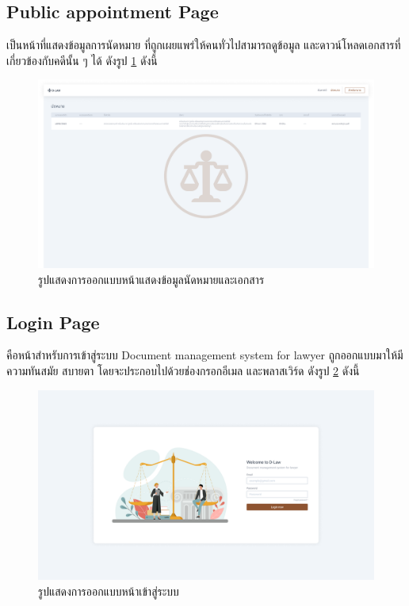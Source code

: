 \documentclass[12pt,oneside,openright,a4paper]{cpe-thai-project}
\begin{document}
\newpage
\subsection{Public appointment Page}
\hspace*{1cm} เป็นหน้าที่แสดงข้อมูลการนัดหมาย ที่ถูกเผยแพร่ให้คนทั่วไปสามารถดูข้อมูล และดาวน์โหลดเอกสารที่เกี่ยวข้องกับคดีนั้น ๆ ได้ ดังรูป \ref{fig:appoinmtment-page} ดังนี้ 
\begin{figure}[!h]\centering
  \includegraphics[width=16cm]{./assets/userinterface/appointment-public.png}
  \caption{รูปแสดงการออกแบบหน้าแสดงข้อมูลนัดหมายและเอกสาร}\label{fig:appoinmtment-page}
\end{figure}

\subsection{Login Page}
\hspace*{1cm} คือหน้าสำหรับการเข้าสู่ระบบ Document management system for lawyer ถูกออกแบบมาให้มีความทันสมัย สบายตา โดยจะประกอบไปด้วยช่องกรอกอีเมล และพลาสเวิร์ด ดังรูป \ref{fig:login-page} ดังนี้
\begin{figure}[!h]\centering
  \includegraphics[width=16cm]{./assets/userinterface/login-page.png}
  \caption{รูปแสดงการออกแบบหน้าเข้าสู่ระบบ}\label{fig:login-page}
\end{figure}
\end{document}
